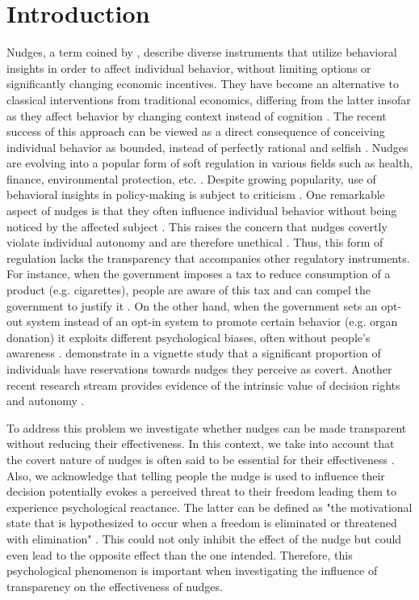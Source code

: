 \documentclass[review, authoryear,12pt]{elsarticle}
\begin{document}
\section{Introduction}
Nudges, a term coined by \cite{Thaler.2008}, describe diverse instruments that utilize behavioral insights in order to affect individual behavior, without limiting options or significantly changing economic incentives. They have become an alternative to classical interventions from traditional economics, differing from the latter insofar as they affect behavior by changing context instead of cognition \citep{Dolan.2012}. The recent success of this approach can be viewed as a direct consequence of conceiving individual behavior as bounded, instead of perfectly rational and selfish \citep{Bolton.2012}. Nudges are evolving into a popular form of soft regulation in various fields such as health, finance, environmental protection, etc. \citep{Sunstein.2014b, Alemanno.2015, WorldBank.2015, Lourenco.2016}. Despite growing popularity, use of behavioral insights in policy-making is subject to criticism \citep[e.g.][]{Hausman.2010, Rebonato.2014}. One remarkable aspect of nudges is that they often influence individual behavior without being noticed by the affected subject \citep{Dhingra.2012, Hansen.2013, Sunstein.2016}. This raises the concern that nudges covertly violate individual autonomy and are therefore unethical \citep{Bovens.2009, HouseofLordsReport.2011}. Thus, this form of regulation lacks the transparency that accompanies other regulatory instruments. For instance, when the government imposes a tax to reduce consumption of a product (e.g. cigarettes), people are aware of this tax and can compel the government to justify it \citep{Sunstein.2014c}. On the other hand, when the government sets an opt-out system instead of an opt-in system to promote certain behavior (e.g. organ donation) it exploits different psychological biases, often without people's awareness \citep{Hansen.2013}. \cite{Felsen.2013} demonstrate in a vignette study that a significant proportion of individuals have reservations towards nudges they perceive as covert. Another recent research stream provides evidence of the intrinsic value of decision rights and autonomy \citep{Fehr.2013, Bartling.2014, Owens.2014}.

To address this problem we investigate whether nudges can be made transparent without reducing their effectiveness. In this context, we take into account that the covert nature of nudges is often said to be essential for their effectiveness \citep{Bovens.2009, HouseofLordsReport.2011}. Also, we acknowledge that telling people the nudge is used to influence their decision potentially evokes a perceived threat to their freedom leading them to experience psychological reactance. The latter can be defined as "the motivational state that is hypothesized to occur when a freedom is eliminated or threatened with elimination" \citep[p. 37]{Brehm.2013}. This could not only inhibit the effect of the nudge but could even lead to the opposite effect than the one intended. Therefore, this psychological phenomenon is important when investigating the influence of transparency on the effectiveness of nudges.
\end{document}
